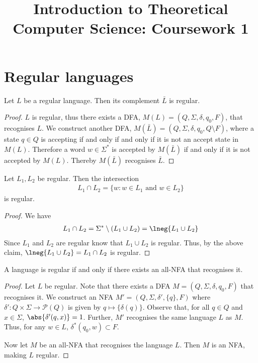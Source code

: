 \documentclass{article}
\title{Introduction to Theoretical Computer Science: Coursework 1}
\begin{document}
\section{Regular languages}

\begin{claim}
    Let $L$ be a regular language. Then its complement $\bar L$ is regular.
\end{claim}
\begin{proof}
    $L$ is regular, thus there exists a DFA, $M(L)=(Q,\Sigma,\delta,q_0,F)$,
    that recognises $L$. We construct another DFA, 
    $M(\bar L)=(Q,\Sigma,\delta,q_0,Q\setminus F)$, where a state $q\in Q$ is 
    accepting if and only if and only if it is not an accept state in 
    $M(L)$. Therefore a word $w\in\Sigma^*$ is accepted by $M(\bar L)$
    if and only if it is not accepted by $M(L)$. Thereby $M(\bar L)$ 
    recognises $\bar L$.
\end{proof}

\begin{claim}
    Let $L_1,L_2$ be regular. Then the intersection 
    \begin{align*}
        L_1\cap L_2 = \{w : w \in L_1 \text{ and } w \in L_2\}
    \end{align*}
    is regular.
\end{claim}
\begin{proof}
    We have 
    \begin{align*}
        L_1 \cap L_2 = \Sigma^*\setminus (L_1\cup L_2) = \lneg{L_1\cup L_2}
    \end{align*}
    Since $L_1$ and $L_2$ are regular know that $L_1\cup L_2$ is regular.
    Thus, by the above claim, $\lneg{L_1\cup L_2}=L_1\cap L_2$ is regular.
\end{proof}

\begin{claim}
    A language is regular if and only if there exists an all-NFA that recognises it.
\end{claim}
\begin{proof}
    Let $L$ be regular. Note that there exists a DFA $M=(Q,\Sigma,\delta,q_0,F)$ 
    that recognises it. We construct an NFA $M'=(Q,\Sigma,\delta',\{q\},F)$
    where $\delta':Q\times\Sigma \to \mathcal{P}(Q)$ is given by $q \mapsto \{\delta(q)\}$.
    Observe that, for all $q\in Q$ and $x\in\Sigma$, $\abs{\delta'(q,x)}=1$.
    Further, $M'$ recognises the same language $L$ as $M$.
    Thus, for any $w\in L$, $\delta^*(q_0,w)\subset F$.

    Now let $M$ be an all-NFA that recognises the language $L$. Then $M$ is an
    NFA, making $L$ regular.
\end{proof}
\end{document}
